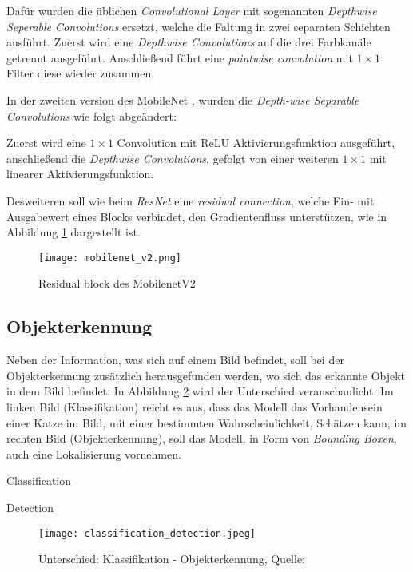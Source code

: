 Dafür wurden die üblichen \textit{Convolutional Layer}
mit sogenannten \textit{Depthwise Seperable 
Convolutions} ersetzt, welche die Faltung in zwei separaten 
Schichten ausführt. Zuerst wird eine \textit{Depthwise  
Convolutions} auf die drei Farbkanäle getrennt ausgeführt.
Anschließend führt eine \textit{pointwise convolution}
mit $1\times1$ Filter diese wieder zusammen.


In der zweiten version des MobileNet
\cite{sandlerMobileNetV2InvertedResiduals2019},
wurden die \textit{Depth-wise Separable Convolutions}
wie folgt abgeändert:

Zuerst wird eine $1\times1$ Convolution mit ReLU
Aktivierungsfunktion ausgeführt, anschließend die 
\textit{Depthwise Convolutions}, gefolgt 
von einer weiteren $1\times1$ mit linearer 
Aktivierungsfunktion.


Desweiteren soll wie beim \textit{ResNet} eine 
\textit{residual connection}, welche Ein- mit
Ausgabewert eines Blocks verbindet, 
den Gradientenfluss unterstützen, wie in Abbildung 
\ref{fig:mobilenetv2} dargestellt ist.
\vspace{1cm}

\begin{figure}[H]
    \centering
    \texttt{[image: mobilenet\_v2.png]}
    \caption{Residual block des MobilenetV2
    \cite{mobilenetv2Bild}}
    \label{fig:mobilenetv2}
\end{figure}


\subsection{Objekterkennung}\label{subsec:objdet_det}

Neben der Information, was sich auf einem Bild befindet, 
soll bei der Objekterkennung zusätzlich herausgefunden werden, 
wo sich das erkannte Objekt in dem Bild befindet.
In Abbildung \ref{fig:class_vs_det} wird der Unterschied 
veranschaulicht. Im linken Bild (Klassifikation) 
reicht es aus, dass das Modell das Vorhandensein einer Katze
im Bild, mit einer bestimmten Wahrscheinlichkeit, Schätzen kann,
im rechten Bild (Objekterkennung), soll das Modell, 
in Form von \textit{Bounding Boxen}, auch eine 
Lokalisierung vornehmen.

\vspace{1cm}
\begin{minipage}{0.5\textwidth}
    \centering
    Classification
\end{minipage}
\begin{minipage}{0.5\textwidth}
    \centering
    Detection
\end{minipage}
\begin{figure}[H]
    \centering
    \texttt{[image: classification\_detection.jpeg]}
    \caption{Unterschied: Klassifikation - Objekterkennung, 
    Quelle: \cite{ouaknineReviewDeepLearning2018a}}
    \label{fig:class_vs_det}
\end{figure}
\vspace{1cm}

